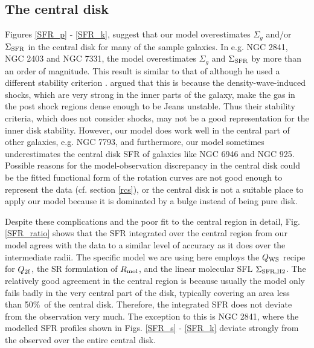 \documentclass[12pt,preprint]{aastex}
\begin{document}
\subsection{The central disk}
\label{centraldisk}


Figures \ref{SFR_p} - \ref{SFR_k}, suggest that our model overestimates
$\Sigma_g$ and/or  $\Sigma_{\rm SFR}$ in the central disk for many of the sample galaxies. 
In e.g. NGC 2841, NGC 2403 and NGC 7331, 
the model overestimates  $\Sigma_g$ and $\Sigma_{\rm SFR}$  by more than an order of magnitude. 
This result is similar to that of \citet{qui72} although he used a different stability criterion \citep{gol65}. 
\citet{qui72} argued that  this is because the density-wave-induced shocks, 
which are very strong in the inner parts of the galaxy, 
make the gas in the post shock regions dense enough to be Jeans unstable. 
Thus their stability criteria, which does not consider shocks, 
may not be a good representation for the inner disk stability. 
However, our model does work well in the central part of other galaxies, e.g. NGC 7793, 
and furthermore, our model sometimes underestimates the central disk SFR of galaxies like NGC 6946 and NGC 925. 
Possible reasons for the model-observation discrepancy in the central disk could be 
the  fitted functional form of the rotation curves are not good enough to represent the data (cf. section \ref{rcs}),
or the central disk is not a suitable place to apply our model because it is dominated by a bulge instead of being pure disk.

Despite these complications and the poor fit to the central region in detail,  Fig. \ref{SFR_ratio} shows that the SFR integrated over the central region from our model agrees with the data to a similar level of accuracy as it does over the intermediate radii. The specific model we are using here employs the $Q_{\rm WS}$ recipe for $Q_{\rm 2f}$, the SR formulation of $R_{\rm mol}$, and the linear molecular SFL $\Sigma_{\rm SFR,H2}$. The relatively good agreement in the central region is because usually the model only fails badly in the very central part of the disk,
typically covering an area less than 50\%\  of the  central disk. 
Therefore, the integrated SFR does not deviate from the observation very much.
The exception to this is NGC 2841, where the modelled SFR profiles shown in Figs. \ref{SFR_s} - \ref{SFR_k} deviate strongly from the observed over the entire central disk. 
\end{document}
